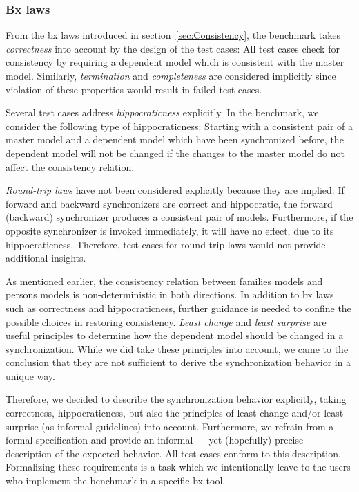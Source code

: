 \subsubsection{Bx laws}
\label{sec:BxLaws}

From the bx  laws introduced in section~\ref{sec:Consistency}, the benchmark takes \emph{correctness} into account by the design of the test cases: All test cases check for consistency by requiring a dependent model which is consistent with the master model. Similarly, \emph{termination} and \emph{completeness} are considered implicitly since violation of these properties would result in failed test cases.

Several test cases address \emph{hippocraticness} explicitly. In the benchmark, we consider the following type of hippocraticness: Starting with a consistent pair of a master model and a dependent model which have been synchronized before, the dependent model will not be changed if the changes to the master model do not affect the consistency relation. 

\emph{Round-trip laws} have not been considered explicitly because they are implied: If forward and backward synchronizers are correct and hippocratic, the forward (backward) synchronizer produces a consistent pair of models. Furthermore, if the opposite synchronizer is invoked immediately, it will have no effect, due to its hippocraticness. Therefore, test cases for round-trip laws would not provide additional insights.

As mentioned earlier, the consistency relation between families models and persons models is non-de\-ter\-min\-istic in both directions. In addition to bx laws such as correctness and hippocraticness, further guidance is needed to confine the possible choices in restoring consistency. \emph{Least change} and \emph{least surprise} are useful principles to determine how the dependent model should be changed in a synchronization. While we did take these principles into account, we came to the conclusion that they are not sufficient to derive the synchronization behavior in a unique way. 

Therefore, we decided to describe the synchronization behavior explicitly, taking correctness, hippocraticness, but also the principles of least change and/or least surprise (as informal guidelines) into account. Furthermore, we refrain from a formal specification and provide an informal --- yet (hopefully) precise --- description of the expected behavior. All test cases conform to this description. Formalizing these requirements is a task which we intentionally leave to the  users who implement the benchmark in a specific bx tool. 



